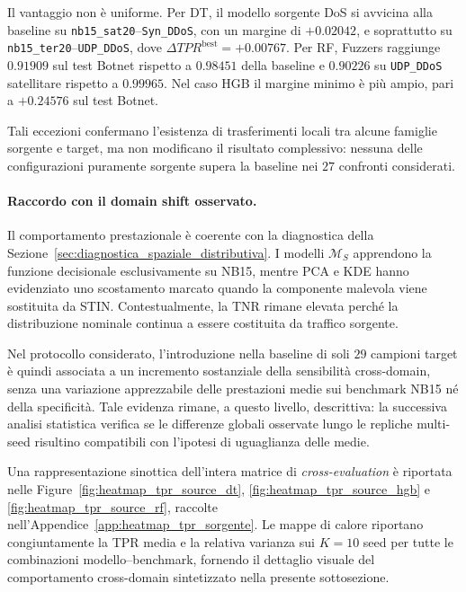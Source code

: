 Il vantaggio non è uniforme. 
Per DT, il modello sorgente DoS si avvicina alla baseline su \texttt{nb15\_sat20}--\texttt{Syn\_DDoS}, con un margine di $+0.02042$, e soprattutto su
\texttt{nb15\_ter20}--\texttt{UDP\_DDoS}, dove $\Delta TPR^{\mathrm{best}}=+0.00767$. 
Per RF, Fuzzers raggiunge $0.91909$ sul test Botnet rispetto a $0.98451$ della baseline e $0.90226$ su \texttt{UDP\_DDoS} satellitare rispetto a $0.99965$. 
Nel caso HGB il margine minimo è più ampio, pari a $+0.24576$ sul test Botnet.

Tali eccezioni confermano l'esistenza di trasferimenti locali tra alcune famiglie sorgente e target, ma non modificano il risultato complessivo: nessuna delle configurazioni puramente sorgente supera la baseline nei $27$ confronti considerati.

\paragraph{Raccordo con il domain shift osservato.}
Il comportamento prestazionale è coerente con la diagnostica della Sezione~\ref{sec:diagnostica_spaziale_distributiva}. 
I modelli $\mathcal{M}_{S}$ apprendono la funzione decisionale esclusivamente su NB15, mentre PCA e KDE hanno evidenziato uno scostamento marcato quando la componente malevola viene sostituita da STIN. 
Contestualmente, la TNR rimane elevata perché la distribuzione nominale continua a essere costituita da traffico sorgente.

Nel protocollo considerato, l'introduzione nella baseline di soli $29$ campioni target è quindi associata a un incremento sostanziale della sensibilità cross-domain, senza una variazione apprezzabile delle prestazioni medie sui benchmark NB15 né della specificità. 
Tale evidenza rimane, a questo livello, descrittiva: la successiva analisi statistica verifica se le differenze globali osservate lungo le repliche multi-seed risultino compatibili con l'ipotesi di uguaglianza delle medie.

Una rappresentazione sinottica dell'intera matrice di \textit{cross-evaluation} è riportata nelle Figure~\ref{fig:heatmap_tpr_source_dt}, \ref{fig:heatmap_tpr_source_hgb} e \ref{fig:heatmap_tpr_source_rf}, raccolte nell'Appendice~\ref{app:heatmap_tpr_sorgente}.
Le mappe di calore riportano congiuntamente la TPR media e la relativa varianza sui $K=10$ seed per tutte le combinazioni modello--benchmark, fornendo il dettaglio visuale del comportamento cross-domain sintetizzato nella presente sottosezione.

